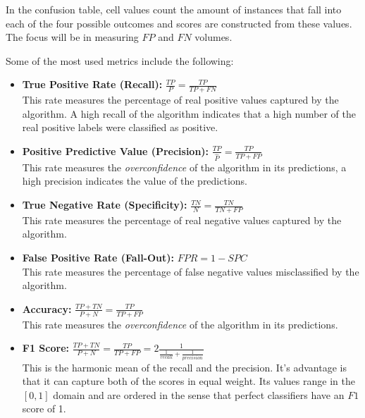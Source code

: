 In the confusion table, cell values count the amount of instances that fall into each of the four possible outcomes and scores are constructed from these values. The focus will be in measuring $FP$ and $FN$ volumes.

Some of the most used metrics include the following:

\begin{itemize}
	\item \textbf{True Positive Rate  (Recall):} $\frac{TP}{P} = \frac{TP}{TP + FN}$ \\ This rate measures the percentage of real positive values captured by the algorithm. A high recall of the algorithm indicates that a high number of the real positive labels were classified as positive.
	
	
	\item \textbf{Positive Predictive Value  (Precision):} $\frac{TP}{\hat{P}} = \frac{TP}{TP + FP}$ \\ This rate measures the \textit{overconfidence} of the algorithm in its predictions, a high precision indicates the value of the predictions.
	
	\item \textbf{True Negative Rate  (Specificity):}  $\frac{TN}{N} = \frac{TN}{TN + FP}$ \\ This rate measures the percentage of real negative values captured by the algorithm.
	
	\item \textbf{False Positive Rate  (Fall-Out):} $FPR = 1 - SPC$ \\ This rate measures the percentage of false negative values misclassified by the algorithm.
	
	\item \textbf{Accuracy:} $\frac{TP + TN}{P + N} = \frac{TP}{TP + FP}$ \\ This rate measures the \textit{overconfidence} of the algorithm in its predictions.
	
	\item \textbf{F1  Score:} $\frac{TP + TN}{P + N} = \frac{TP}{TP + FP} = 2 \frac{1}{  \frac{1}{recall} + \frac{1}{precision}  }$ \\ This is the harmonic mean of the recall and the precision. It's advantage is that it can capture both of the scores in equal weight. Its values range in the $[0,1 ]$ domain and are ordered in the sense that perfect classifiers have an $F1$ score of 1.
	
\end{itemize}
